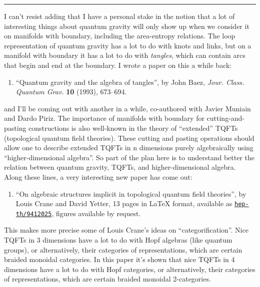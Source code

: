 \documentclass{article}
\def\tightlist{}
\begin{document}
\begin{center}\rule{0.5\linewidth}{0.5pt}\end{center}

I can't resist adding that I have a personal stake in the notion that a
lot of interesting things about quantum gravity will only show up when
we consider it on manifolds with boundary, including the area-entropy
relations. The loop representation of quantum gravity has a lot to do
with knots and links, but on a manifold with boundary it has a lot to do
with \emph{tangles}, which can contain arcs that begin and end at the
boundary. I wrote a paper on this a while back:

\begin{enumerate}
\def\labelenumi{\arabic{enumi})}
\setcounter{enumi}{6}
\tightlist
\item
  ``Quantum gravity and the algebra of tangles'', by John Baez,
  \emph{Jour. Class. Quantum Grav.} \textbf{10} (1993), 673--694.
\end{enumerate}

and I'll be coming out with another in a while, co-authored with Javier
Muniain and Dardo Piriz. The importance of manifolds with boundary for
cutting-and-pasting constructions is also well-known in the theory of
``extended'' TQFTs (topological quantum field theories). These cutting
and pasting operations should allow one to describe extended TQFTs in n
dimensions purely algebraically using ``higher-dimensional algebra''. So
part of the plan here is to understand better the relation between
quantum gravity, TQFTs, and higher-dimensional algebra. Along these
lines, a very interesting new paper has come out:

\begin{enumerate}
\def\labelenumi{\arabic{enumi})}
\setcounter{enumi}{7}
\tightlist
\item
  ``On algebraic structures implicit in topological quantum field
  theories'', by Louis Crane and David Yetter, 13 pages in LaTeX format,
  available as
  \href{http://xxx.lanl.gov/abs/hep-th/9412025}{\texttt{hep-th/9412025}},
  figures available by request.
\end{enumerate}

This makes more precise some of Louis Crane's ideas on
``categorification''. Nice TQFTs in 3 dimensions have a lot to do with
Hopf algebras (like quantum groups), or alternatively, their categories
of representations, which are certain braided monoidal categories. In
this paper it's shown that nice TQFTs in 4 dimensions have a lot to do
with Hopf categories, or alternatively, their categories of
representations, which are certain braided monoidal 2-categories.
\end{document}
